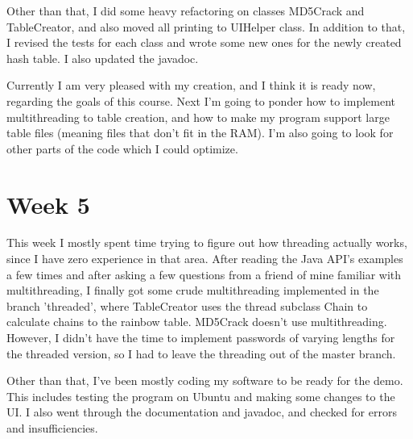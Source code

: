 \documentclass[a4paper, 11pt, finnish]{article}
\begin{document}
Other than that, I did some heavy refactoring on classes MD5Crack and TableCreator, and also moved all printing to UIHelper class. In addition to that, I revised the tests for each class and wrote some new ones for the newly created hash table. I also updated the javadoc.

Currently I am very pleased with my creation, and I think it is ready now, regarding the goals of this course. Next I'm going to ponder how to implement multithreading to table creation, and how to make my program support large table files (meaning files that don't fit in the RAM). I'm also going to look for other parts of the code which I could optimize.

\section*{Week 5}
This week I mostly spent time trying to figure out how threading actually works, since I have zero experience in that area. After reading the Java API's examples a few times and after asking a few questions from a friend of mine familiar with multithreading, I finally got some crude multithreading implemented in the branch 'threaded', where TableCreator uses the thread subclass Chain to calculate chains to the rainbow table. MD5Crack doesn't use multithreading. However, I didn't have the time to implement passwords of varying lengths for the threaded version, so I had to leave the threading out of the master branch.

Other than that, I've been mostly coding my software to be ready for the demo. This includes testing the program on Ubuntu and making some changes to the UI. I also went through the documentation and javadoc, and checked for errors and insufficiencies.
\end{document}

